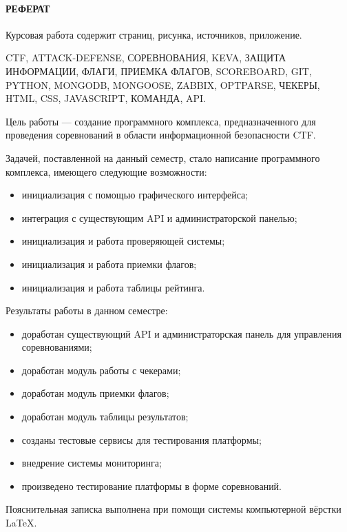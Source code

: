 \newpage
{}
\paragraph{\hfill РЕФЕРАТ \hfill}
Курсовая работа содержит  страниц,  рисунка,  источников,  приложение.

CTF, ATTACK-DEFENSE, СОРЕВНОВАНИЯ, KEVA, ЗАЩИТА ИНФОРМАЦИИ, ФЛАГИ, ПРИЕМКА ФЛАГОВ, SCOREBOARD, GIT, PYTHON, MONGODB, MONGOOSE, ZABBIX, OPTPARSE, ЧЕКЕРЫ, HTML, CSS, JAVASCRIPT, КОМАНДА, API.

Цель работы --- создание программного комплекса, предназначенного для проведения соревнований в области информационной безопасности CTF.

Задачей, поставленной на данный семестр, стало написание программного комплекса, имеющего следующие возможности: 
\begin{itemize}
\item инициализация с помощью графического интерфейса;
\item интеграция с существующим API и администраторской панелью; 
\item инициализация и работа проверяющей системы;
\item инициализация и работа приемки флагов;
\item инициализация и работа таблицы рейтинга.
\end{itemize}

Результаты работы в данном семестре:

\begin{itemize}
\item доработан существующий API и администраторская панель для управления соревнованиями; 
\item доработан модуль работы с чекерами;
\item доработан модуль приемки флагов;
\item доработан модуль таблицы результатов;
\item созданы тестовые сервисы для тестирования платформы;
\item внедрение системы мониторинга;
\item произведено тестирование платформы в форме соревнований.
\end{itemize}

Пояснительная записка выполнена при помощи системы компьютерной вёрстки \LaTeX.
